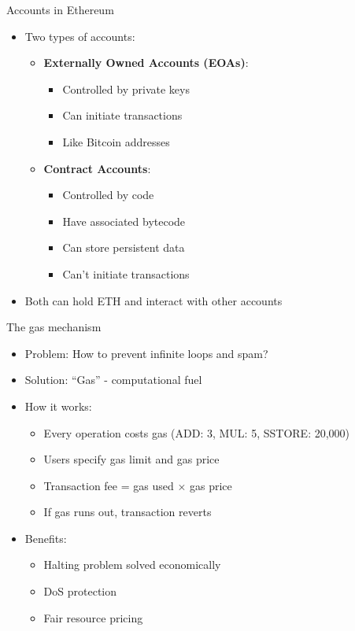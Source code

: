 \documentclass[aspectratio=169, lualatex, handout]{beamer}
\begin{document}
\begin{frame}{Accounts in Ethereum}
	\begin{itemize}
		\item Two types of accounts:
		      \begin{itemize}
			      \item \textbf{Externally Owned Accounts (EOAs)}:
			            \begin{itemize}
				            \item Controlled by private keys
				            \item Can initiate transactions
				            \item Like Bitcoin addresses
			            \end{itemize}
			      \item \textbf{Contract Accounts}:
			            \begin{itemize}
				            \item Controlled by code
				            \item Have associated bytecode
				            \item Can store persistent data
				            \item Can't initiate transactions
			            \end{itemize}
		      \end{itemize}
		\item Both can hold ETH and interact with other accounts
	\end{itemize}
\end{frame}

\begin{frame}{The gas mechanism}
	\begin{itemize}
		\item Problem: How to prevent infinite loops and spam?
		\item Solution: ``Gas'' - computational fuel
		\item How it works:
		      \begin{itemize}
			      \item Every operation costs gas (ADD: 3, MUL: 5, SSTORE: 20,000)
			      \item Users specify gas limit and gas price
			      \item Transaction fee = gas used $\times$ gas price
			      \item If gas runs out, transaction reverts
		      \end{itemize}
		\item Benefits:
		      \begin{itemize}
			      \item Halting problem solved economically
			      \item DoS protection
			      \item Fair resource pricing
		      \end{itemize}
	\end{itemize}
\end{frame}
\end{document}
